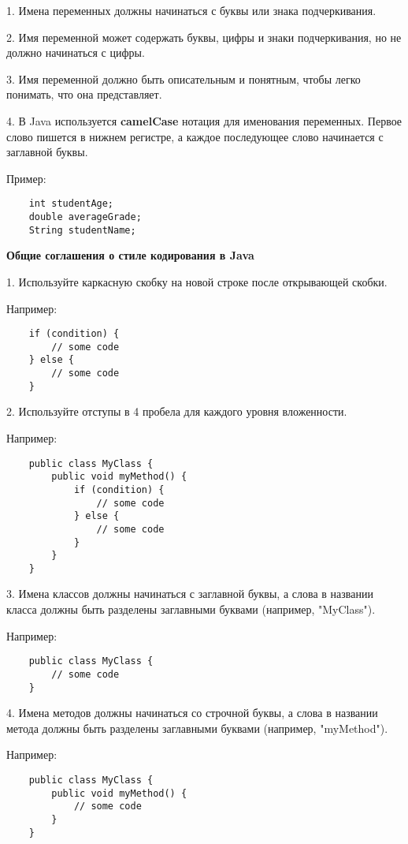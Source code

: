 \documentclass[12pt, a4paper]{book}%
\begin{document}
{1. Имена переменных должны начинаться с буквы или знака подчеркивания.

2. Имя переменной может содержать буквы, цифры и знаки подчеркивания, но не должно начинаться с цифры.

3. Имя переменной должно быть описательным и понятным, чтобы легко понимать, что она представляет.

4. В Java используется {\bf camelCase} нотация для именования переменных. Первое слово пишется в нижнем регистре, а каждое последующее слово начинается с заглавной буквы.

Пример:
\begin{lstlisting}
    int studentAge;
    double averageGrade;
    String studentName;
\end{lstlisting}

{\bf Общие соглашения о стиле кодирования в Java}

1. Используйте каркасную скобку на новой строке после открывающей скобки. 

Например:
\begin{lstlisting}
    if (condition) {
        // some code
    } else {
        // some code
    }
\end{lstlisting}

2. Используйте отступы в 4 пробела для каждого уровня вложенности. 

Например:
\begin{lstlisting}
    public class MyClass {
        public void myMethod() {
            if (condition) {
                // some code
            } else {
                // some code
            }
        }
    }
\end{lstlisting}

3. Имена классов должны начинаться с заглавной буквы, а слова в названии класса должны быть разделены заглавными буквами (например, "MyClass"). 

Например:
\begin{lstlisting}
    public class MyClass {
        // some code
    }
\end{lstlisting}


4. Имена методов должны начинаться со строчной буквы, а слова в названии метода должны быть разделены заглавными буквами (например, "myMethod"). 

Например:
\begin{lstlisting}
    public class MyClass {
        public void myMethod() {
            // some code
        }
    }
\end{lstlisting}

}
\end{document}
